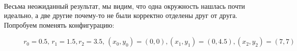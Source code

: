 \documentclass[12pt,twoside]{article}
\begin{document}
\begin{figure}[h]
\end{figure}\\
Весьма неожиданный результат, мы видим, что одна окружность нашлась почти идеально, а две другие почему-то не были корректно отделены друг от друга. \newpage
Попробуем поменять конфигурацию: \\
\begin{figure}[h!]
\caption{$r_0 = 0.5, \, r_1 = 1.5, r_2 = 3.5, \, (x_0, y_0) = (0, 0), (x_1, y_1) = (0, 4.5), (x_2, y_2) = (7, 7)$}
\end{figure} \\ 
\end{document}
